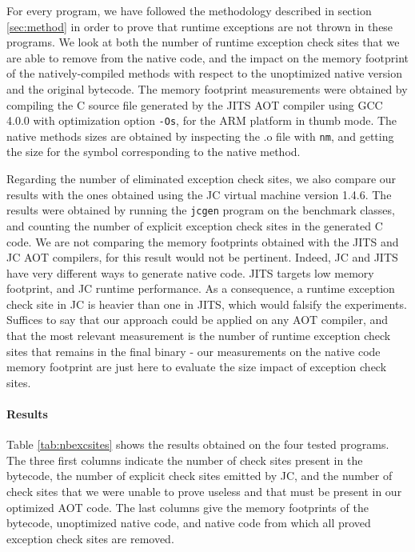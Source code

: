 For every program, we have followed the methodology described in section \ref{sec:method} in order to prove that runtime exceptions are not thrown in these programs. We look at both the number of runtime exception check sites that we are able to remove from the native code, and the impact on the memory footprint of the natively-compiled methods with respect to the unoptimized native version and the original bytecode. The memory footprint measurements were obtained by compiling the C source file generated by the JITS AOT compiler using GCC 4.0.0 with optimization option \texttt{-Os}, for the ARM platform in thumb mode. The native methods sizes are obtained by inspecting the .o file with \texttt{nm}, and getting the size for the symbol corresponding to the native method.

Regarding the number of eliminated exception check sites, we also
compare our results with the ones obtained using the JC virtual
machine version 1.4.6. The results were obtained by running the
\texttt{jcgen} program on the benchmark classes, and counting the
number of explicit exception check sites in the generated C code. We
are not comparing the memory footprints obtained with the JITS and JC
AOT compilers, for this result would not be pertinent. Indeed, JC and
JITS have very different ways to generate native code. JITS targets
low memory footprint, and JC runtime performance. As a consequence, a
runtime exception check site in JC is heavier than one in JITS, which
would falsify the experiments. Suffices to say that our approach could
be applied on any AOT compiler, and that the most relevant measurement
is the number of runtime exception check sites that remains in the
final binary - our measurements on the native code memory footprint
are just here to evaluate the size impact of exception check sites.

\paragraph{Results}
\label{results}
Table \ref{tab:nbexcsites} shows the results obtained on the four tested programs. The three first columns indicate the number of check sites present in the bytecode, the number of explicit check sites emitted by JC, and the number of check sites that we were unable to prove useless and that must be present in our optimized AOT code. The last columns give the memory footprints of the bytecode, unoptimized native code, and native code from which all proved exception check sites are removed.

